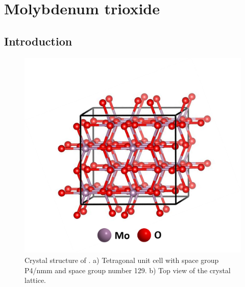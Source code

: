 \section{Molybdenum trioxide}

\subsection{Introduction}

 \begin{figure}[th!]
  \centering
  \includegraphics[width=\textwidth]{Figures/chap6fig/MoO3crys}
    \caption{Crystal structure of . a) Tetragonal unit cell with space group P4/nmm and space group number 129. b) Top view of the crystal lattice.}
  \label{Figures/chap6fig:MoO3crys}
\end{figure}

